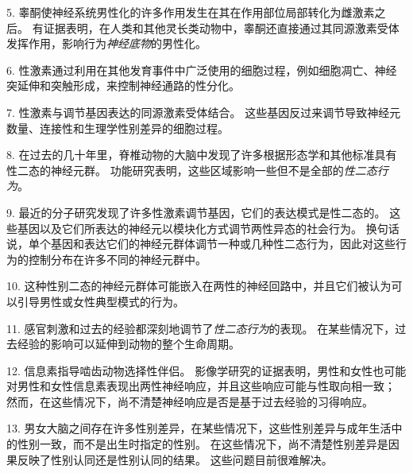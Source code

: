 5. 睾酮使神经系统男性化的许多作用发生在其在作用部位局部转化为雌激素之后。
有证据表明，在人类和其他灵长类动物中，睾酮还直接通过其同源激素受体发挥作用，影响行为\textit{神经底物}的男性化。


6. 性激素通过利用在其他发育事件中广泛使用的细胞过程，例如细胞凋亡、神经突延伸和突触形成，来控制神经通路的性分化。


7. 性激素与调节基因表达的同源激素受体结合。
这些基因反过来调节导致神经元数量、连接性和生理学性别差异的细胞过程。


8. 在过去的几十年里，脊椎动物的大脑中发现了许多根据形态学和其他标准具有性二态的神经元群。
功能研究表明，这些区域影响一些但不是全部的\textit{性二态行为}。


9. 最近的分子研究发现了许多性激素调节基因，它们的表达模式是性二态的。
这些基因以及它们所表达的神经元以模块化方式调节两性异态的社会行为。
换句话说，单个基因和表达它们的神经元群体调节一种或几种性二态行为，因此对这些行为的控制分布在许多不同的神经元群中。


10. 这种性别二态的神经元群体可能嵌入在两性的神经回路中，并且它们被认为可以引导男性或女性典型模式的行为。


11. 感官刺激和过去的经验都深刻地调节了\textit{性二态行为}的表现。
在某些情况下，过去经验的影响可以延伸到动物的整个生命周期。


12. 信息素指导啮齿动物选择性伴侣。
影像学研究的证据表明，男性和女性也可能对男性和女性信息素表现出两性神经响应，并且这些响应可能与性取向相一致；
然而，在这些情况下，尚不清楚神经响应是否是基于过去经验的习得响应。


13. 男女大脑之间存在许多性别差异，在某些情况下，这些性别差异与成年生活中的性别一致，而不是出生时指定的性别。
在这些情况下，尚不清楚性别差异是因果反映了性别认同还是性别认同的结果。
这些问题目前很难解决。



